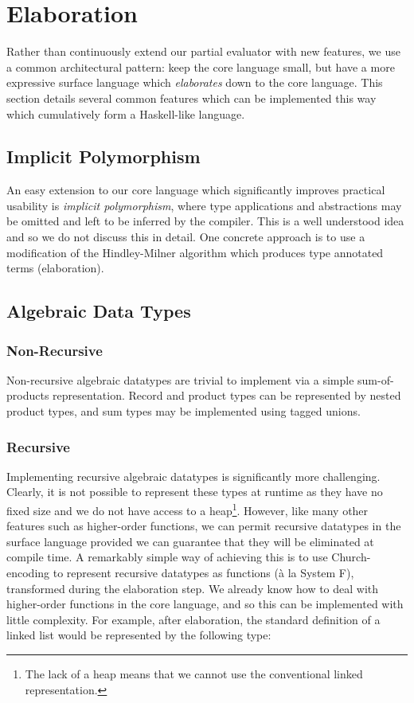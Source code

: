 \documentclass[runningheads]{llncs}
\begin{document}
\section{Elaboration} \label{sec:elaboration}

Rather than continuously extend our partial evaluator with new features, we use a common architectural pattern: keep the core language small, but have a more expressive surface language which \emph{elaborates} down to the core language. This section details several common features which can be implemented this way which cumulatively form a Haskell-like language.

\subsection{Implicit Polymorphism}

An easy extension to our core language which significantly improves practical usability is \emph{implicit polymorphism}, where type applications and abstractions may be omitted and left to be inferred by the compiler. This is a well understood idea and so we do not discuss this in detail. One concrete approach is to use a modification of the Hindley-Milner algorithm \cite{milner1978theory} which produces type annotated terms (elaboration).

\subsection{Algebraic Data Types}

\subsubsection{Non-Recursive}

Non-recursive algebraic datatypes are trivial to implement via a simple sum-of-products representation. Record and product types can be represented by nested product types, and sum types may be implemented using tagged unions.

\subsubsection{Recursive}

Implementing recursive algebraic datatypes is significantly more challenging. Clearly, it is not possible to represent these types at runtime as they have no fixed size and we do not have access to a heap\footnote{The lack of a heap means that we cannot use the conventional linked representation.}. However, like many other features such as higher-order functions, we can permit recursive datatypes in the surface language provided we can guarantee that they will be eliminated at compile time. A remarkably simple way of achieving this is to use Church-encoding to represent recursive datatypes as functions (à la System F), transformed during the elaboration step. We already know how to deal with higher-order functions in the core language, and so this can be implemented with little complexity. For example, after elaboration, the standard definition of a linked list would be represented by the following type:
\end{document}
